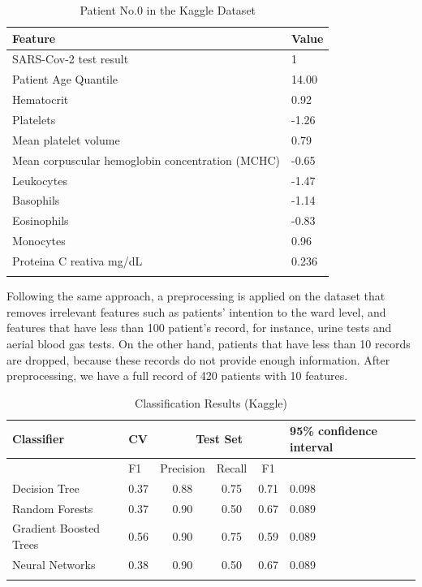 \begin{table}[H]
\centering
\caption{Patient No.0 in the Kaggle Dataset}
\begin{tabular}{@{}ll@{}}
\toprule
Feature & Value\\ 
\midrule
SARS-Cov-2 test result & 1 \\
Patient Age Quantile & 14.00\\
Hematocrit  & 0.92\\
Platelets  & -1.26\\ 
Mean platelet volume  & 0.79\\ 
Mean corpuscular hemoglobin concentration (MCHC)  & -0.65\\
Leukocytes & -1.47\\
Basophils  & -1.14\\
Eosinophils & -0.83\\
Monocytes & 0.96\\  
Proteina C reativa mg/dL & 0.236\\ 
\bottomrule
\label{tab:kaggle}
\end{tabular}
\end{table}

Following the same approach, a preprocessing is applied on the dataset that removes irrelevant features such as patients' intention to the ward level, and features that have less than 100 patient's record, for instance, urine tests and aerial blood gas tests. On the other hand, patients that have less than 10 records are dropped, because these records do not provide enough information. After preprocessing, we have a full record of 420 patients with 10 features.
\color{black}

\begin{table}[H]
\centering
\caption{Classification Results (Kaggle)}
\begin{tabular}{p{2cm}p{1.1cm}cccp{1cm}}
\toprule
Classifier    & CV & \multicolumn{3}{c}{Test Set} & 95\% confidence interval \\ \midrule
              & F1               & Precision  & Recall  & F1    &\\
Decision Tree & 0.37             & 0.88       & 0.75    & 0.71  & 0.098\\
Random Forests & 0.37             & 0.90       & 0.50    & 0.67  & 0.089\\
Gradient Boosted Trees  & 0.56    & 0.90       & 0.75    & 0.59 & 0.089\\
Neural Networks       & 0.38             & 0.90       & 0.50    & 0.67 & 0.089\\ \bottomrule
\label{tab:kaggle_models}
\end{tabular}
\end{table}

